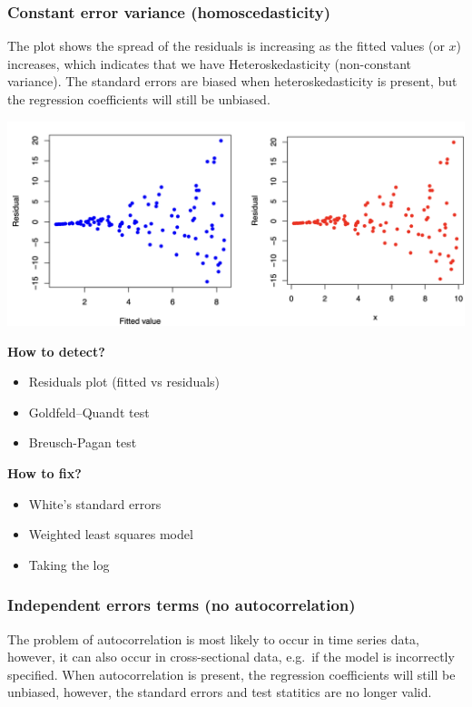 \documentclass[
]{article}
\begin{document}
\hypertarget{constant-error-variance-homoscedasticity}{%
\subsubsection{Constant error variance
(homoscedasticity)}\label{constant-error-variance-homoscedasticity}}

The plot shows the spread of the residuals is increasing as the fitted
values (or \(x\)) increases, which indicates that we have
Heteroskedasticity (non-constant variance). The standard errors are
biased when heteroskedasticity is present, but the regression
coefficients will still be unbiased.

\begin{center}\includegraphics[width=0.7\linewidth,height=0.7\textheight]{figures/ass7} \end{center}

\textbf{How to detect?}

\begin{itemize}
\item
  Residuals plot (fitted vs residuals)
\item
  Goldfeld--Quandt test
\item
  Breusch-Pagan test
\end{itemize}

\textbf{How to fix?}

\begin{itemize}
\item
  White's standard errors
\item
  Weighted least squares model
\item
  Taking the log
\end{itemize}

\hypertarget{independent-errors-terms-no-autocorrelation}{%
\subsubsection{Independent errors terms (no
autocorrelation)}\label{independent-errors-terms-no-autocorrelation}}

The problem of autocorrelation is most likely to occur in time series
data, however, it can also occur in cross-sectional data, e.g.~if the
model is incorrectly specified. When autocorrelation is present, the
regression coefficients will still be unbiased, however, the standard
errors and test statitics are no longer valid.
\end{document}
